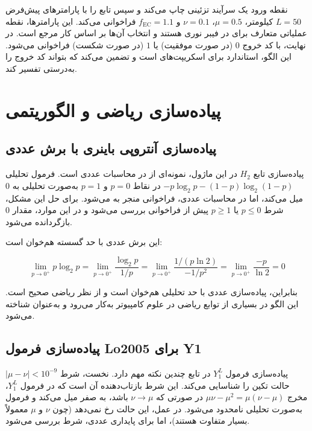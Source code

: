 نقطه ورود  یک سرآیند تزئینی چاپ می‌کند و سپس تابع  را با پارامترهای پیش‌فرض $L = 50$ کیلومتر، $\mu = 0.5$، $\nu = 0.1$ و $f_{\text{EC}} = 1.1$ فراخوانی می‌کند. این پارامترها، نقطه عملیاتی متعارف برای  در فیبر نوری هستند و انتخاب آن‌ها بر اساس کار مرجع  است. در نهایت،  با کد خروج $0$ (در صورت موفقیت) یا $1$ (در صورت شکست) فراخوانی می‌شود. این الگو، استاندارد  برای اسکریپت‌های  است و تضمین می‌کند که  بتواند کد خروج را به‌درستی تفسیر کند.

\section{پیاده‌سازی ریاضی و الگوریتمی}

\subsection{پیاده‌سازی آنتروپی باینری با برش عددی}

پیاده‌سازی تابع $H_2$ در این ماژول، نمونه‌ای از  در محاسبات عددی است. فرمول تحلیلی $-p \log_2 p - (1-p) \log_2(1-p)$ در نقاط $p = 0$ و $p = 1$ به‌صورت تحلیلی به $0$ میل می‌کند، اما در محاسبات عددی، فراخوانی  منجر به  می‌شود. برای حل این مشکل، شرط $p \leq 0$ یا $p \geq 1$ پیش از فراخوانی  بررسی می‌شود و در این موارد، مقدار $0$ بازگردانده می‌شود.

این برش عددی با حد گسسته  هم‌خوان است:

\begin{equation}
	\lim_{p \to 0^+} p \log_2 p = \lim_{p \to 0^+} \frac{\log_2 p}{1/p} = \lim_{p \to 0^+} \frac{1/(p \ln 2)}{-1/p^2} = \lim_{p \to 0^+} \frac{-p}{\ln 2} = 0
\end{equation}

بنابراین، پیاده‌سازی عددی با حد تحلیلی هم‌خوان است و از نظر ریاضی صحیح است. این الگو در بسیاری از توابع ریاضی در علوم کامپیوتر به‌کار می‌رود و به‌عنوان  شناخته می‌شود.

\subsection{پیاده‌سازی فرمول Lo2005 برای Y1}

پیاده‌سازی فرمول $Y_1^L$ در تابع  چندین نکته مهم دارد. نخست، شرط $\left| \mu - \nu \right| < 10^{-9}$ حالت تکین را شناسایی می‌کند. این شرط بازتاب‌دهنده آن است که در فرمول $Y_1^L$، مخرج $\mu \nu - \mu^2 = \mu(\nu - \mu)$ در صورتی که $\nu \to \mu$ باشد، به صفر میل می‌کند و فرمول به‌صورت تحلیلی نامحدود می‌شود. در عمل، این حالت رخ نمی‌دهد (چون $\nu$ و $\mu$ معمولاً بسیار متفاوت هستند)، اما برای پایداری عددی، شرط بررسی می‌شود.

